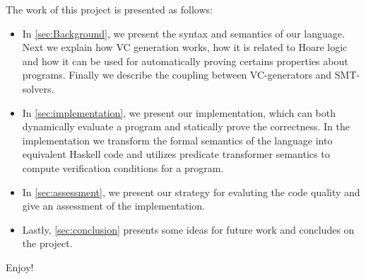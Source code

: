 
The work of this project is presented as follows:

\begin{itemize}
  \item In \autoref{sec:Background}, we present the syntax and semantics of our language.
  Next we explain how VC generation works, how it is related to Hoare logic and how it can be used for automatically proving certains properties about programs. Finally we describe the coupling between VC-generators and SMT-solvers.
\item In \autoref{sec:implementation}, we present our implementation, which can both dynamically evaluate a program and statically prove the correctness.
In the implementation we transform the formal semantics of the language into equivalent Haskell code and utilizes predicate transformer semantics to compute verification conditions for a program.
\item In \autoref{sec:assessment}, we present our strategy for evaluting the code quality and give an assessment of the implementation.
\item Lastly, \autoref{sec:conclusion} presents some ideas for future work and concludes on the project.
\end{itemize}

Enjoy!
